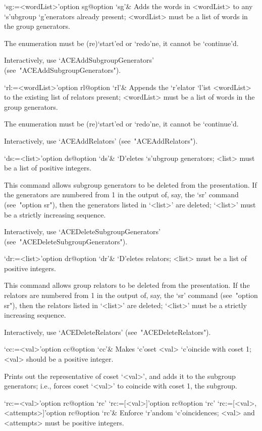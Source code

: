 \>`sg:=<wordList>'{option sg}@{option `sg'}&
Adds the words in <wordList> to any  `s'ubgroup  `g'enerators  already
present; <wordList> must be a list of words in the group generators.

The enumeration must  be  (re)`start'ed  or  `redo'ne,  it  cannot  be
`continue'd.

Interactively,             use              `ACEAddSubgroupGenerators'
(see~"ACEAddSubgroupGenerators").

\>`rl:=<wordList>'{option rl}@{option `rl'}&
Appends the `r'elator  `l'ist  <wordList>  to  the  existing  list  of
relators present; <wordList> must be a list  of  words  in  the  group
generators.

The enumeration must  be  (re)`start'ed  or  `redo'ne,  it  cannot  be
`continue'd.

Interactively, use `ACEAddRelators' (see~"ACEAddRelators").

\>`ds:=<list>'{option ds}@{option `ds'}&
`D'eletes `s'ubgroup generators; <list> must be  a  list  of  positive
integers.

This command  allows  subgroup  generators  to  be  deleted  from  the
presentation. If the generators are numbered from 1 in the output  of,
say, the `sr' command (see~"option sr"), then the generators listed in
`<list>' are deleted; `<list>' must be a strictly increasing sequence.

Interactively,            use            `ACEDeleteSubgroupGenerators'
(see~"ACEDeleteSubgroupGenerators").

\>`dr:=<list>'{option dr}@{option `dr'}&
`D'eletes relators; <list> must be a list of positive integers.

This  command  allows  group  relators  to   be   deleted   from   the
presentation. If the relators are numbered from 1 in  the  output  of,
say, the `sr' command (see~"option sr"), then the relators  listed  in
`<list>' are deleted; `<list>' must be a strictly increasing sequence.

Interactively, use `ACEDeleteRelators' (see~"ACEDeleteRelators").

\>`cc:=<val>'{option cc}@{option `cc'}&
Makes `c'oset <val>  `c'oincide  with  coset  1;  <val>  should  be  a
positive integer.

Prints out the representative of coset `<val>', and  adds  it  to  the
subgroup generators; i.e., forces coset `<val>' to coincide with coset
1, the subgroup.

\>`rc:=<val>'{option rc}@{option `rc'}
\>`rc:=[<val>]'{option rc}@{option `rc'}
\>`rc:=[<val>, <attempts>]'{option rc}@{option `rc'}&
Enforce `r'andom `c'oincidences; <val> and <attempts> must be positive
integers.

